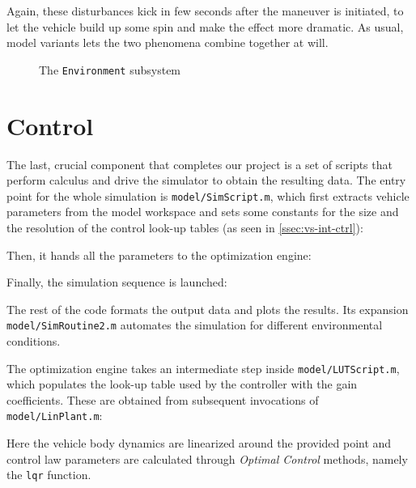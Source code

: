 		Again, these disturbances kick in few seconds after the maneuver is initiated, to let the vehicle build up some spin and make the effect more dramatic.
		As usual, model variants lets the two phenomena combine together at will.
		\begin{figure}[hbtp]
			\centering
			\quad
			\caption{The \lstinline{Environment} subsystem}
			\label{fig:env-parts}
		\end{figure}


	\section{Control}
	\label{sec:vs-ctrl}

	The last, crucial component that completes our project is a set of scripts that perform calculus and drive the simulator to obtain the resulting data.
	The entry point for the whole simulation is \texttt{model/SimScript.m}, which first extracts vehicle parameters from the model workspace and sets some constants for the size and
	the resolution of the control look-up tables (as seen in \ref{ssec:vs-int-ctrl}):
	
	Then, it hands all the parameters to the optimization engine:
	
	Finally, the simulation sequence is launched:
	
	The rest of the code formats the output data and plots the results. Its expansion \texttt{model/SimRoutine2.m} automates the simulation for different environmental conditions.

	The optimization engine takes an intermediate step inside \texttt{model/LUTScript.m}, which populates the look-up table used by the controller with the gain coefficients.
	These are obtained from subsequent invocations of \texttt{model/LinPlant.m}:
	
	Here the vehicle body dynamics are linearized around the provided point and control law
	parameters are calculated through \emph{Optimal Control} methods, namely the \lstinline{lqr} \mwML{} function.
